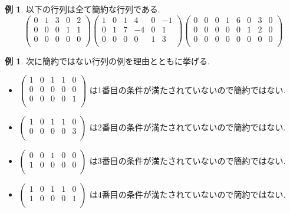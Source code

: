 \documentclass[dvipdfmx,a4paper,11pt]{article}
\theoremstyle{definition}
\newtheorem{exa}[thm]{例}
\begin{document}
 \begin{exa}
以下の行列は全て簡約な行列である.
$$
 \begin{pmatrix}
 0& 1& 3  & 0&2\\
 0& 0& 0  & 1&1\\
 0& 0& 0 & 0&0\\
 \end{pmatrix}
  \begin{pmatrix}
 1& 0& 1  & 4&0&-1\\
 0& 1& 7 & -4&0&1\\
 0& 0& 0 & 0&1&3\\
 \end{pmatrix}
   \begin{pmatrix}
 0& 0& 0  & 1&6&0&3&0\\
 0& 0& 0 & 0&0&1&2&0\\
 0& 0& 0 & 0&0&0&0&0 \\
 \end{pmatrix}
$$
\end{exa}
 \begin{exa}
 次に簡約ではない行列の例を理由とともに挙げる.
 \begin{itemize}
\item 
$ 
\begin{pmatrix}
 1& 0& 1  & 1&0\\
 0& 0& 0  & 0&0\\
 0& 0& 0 & 0&1\\
 \end{pmatrix} 
 $
 は1番目の条件が満たされていないので簡約ではない.
 \item 
$ 
\begin{pmatrix}
 1& 0& 1  & 1&0\\
 0& 0& 0  & 0&3\\
 \end{pmatrix} 
 $
 は2番目の条件が満たされていないので簡約ではない.
 \item 
$ 
\begin{pmatrix}
 0& 0& 1  & 0&0\\
 1& 0& 0  & 0&0\\
 \end{pmatrix} 
 $
 は3番目の条件が満たされていないので簡約ではない.
 \item 
$ 
\begin{pmatrix}
 1& 0& 1  & 1&0\\
 1& 0& 0  & 0&1\\
 \end{pmatrix} 
 $
 は4番目の条件が満たされていないので簡約ではない.
 \end{itemize}
\end{exa}
\end{document}
